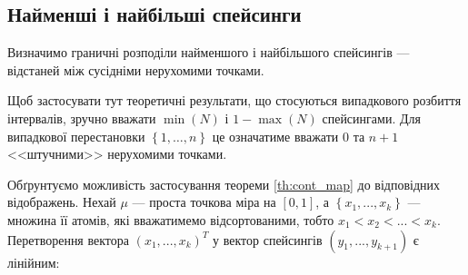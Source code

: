 \subsection{Найменші і найбільші спейсинги}
Визначимо граничні розподіли найменшого і найбільшого спейсингів --- відстаней
між сусідніми нерухомими точками.
\begin{remark}
    Щоб застосувати тут теоретичні результати, що стосуються
    випадкового розбиття інтервалів, зручно вважати
    $\min(N)$ і $1-\max(N)$ спейсингами. Для випадкової
    перестановки $\left\{1, \dots, n\right\}$ це означатиме
    вважати $0$ та $n+1$ <<штучними>> нерухомими точками.
\end{remark}

Обґрунтуємо можливість застосування теореми \ref{th:cont_map} до відповідних відображень.
Нехай $\mu$ --- проста точкова міра на $[0, 1]$,
а $\left\{x_1, ..., x_k\right\}$ --- множина її атомів,
які вважатимемо відсортованими, тобто $x_1 < x_2 < ... < x_k$.
Перетворення вектора $\left(x_1, ..., x_k\right)^T$ у вектор
спейсингів $\left(y_1, ..., y_{k+1}\right)$ є лінійним:
